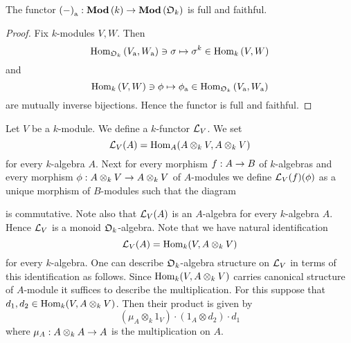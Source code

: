 \begin{proposition}\label{proposition:inclusion_of_k_modules_into_O_k_modules}
The functor $\left(-\right)_{\mathrm{a}}:\mathbf{Mod}\left(k\right)\rightarrow \mathbf{Mod}\left({\mathfrak O}_k\right)$ is full and faithful.
\end{proposition}
\begin{proof}
Fix $k$-modules $V,W$. Then
$$\mathrm{Hom}_{{\mathfrak O}_k}\left(V_{\mathrm{a}},W_{\mathrm{a}}\right)\ni \sigma \mapsto \sigma^k\in \mathrm{Hom}_k\left(V,W\right)$$
and
$$\mathrm{Hom}_k\left(V,W\right) \ni \phi \mapsto \phi_{\mathrm{a}} \in \mathrm{Hom}_{{\mathfrak O}_k}\left(V_{\mathrm{a}},W_{\mathrm{a}}\right)$$
are mutually inverse bijections. Hence the functor is full and faithful.
\end{proof}

\begin{example}\label{example:general_linear_monoid}
Let $V$ be a $k$-module. We define a $k$-functor ${\mathcal L}_V$. We set
$${\mathcal L}_V(A) = \mathrm{Hom}_A(A\otimes_kV,A\otimes_kV)$$
for every $k$-algebra $A$. Next for every morphism $f:A\rightarrow B$ of $k$-algebras and every morphism $\phi:A\otimes_kV\rightarrow A\otimes_kV$ of $A$-modules we define ${\mathcal L}_V(f)(\phi)$ as a unique morphism of $B$-modules such that the diagram
\begin{center}
\end{center}
is commutative. Note also that ${\mathcal L}_V(A)$ is an $A$-algebra for every $k$-algebra $A$. Hence ${\mathcal L}_V$ is a monoid ${\mathfrak O}_k$-algebra. Note that we have natural identification
$${\mathcal L}_V(A) = \mathrm{Hom}_k(V,A\otimes_kV)$$
for every $k$-algebra. One can describe ${\mathfrak O}_k$-algebra structure on ${\mathcal L}_V$ in terms of this identification as follows. Since $\mathrm{Hom}_k(V,A\otimes_kV)$ carries canonical structure of $A$-module it suffices to describe the multiplication. For this suppose that $d_1,d_2\in \mathrm{Hom}_k(V,A\otimes_kV)$. Then their product is given by
$$\left(\mu_A\otimes_k1_V\right)\cdot \left(1_A\otimes d_2\right)\cdot d_1$$
where $\mu_A:A\otimes_kA\rightarrow A$ is the multiplication on $A$.
\end{example}

